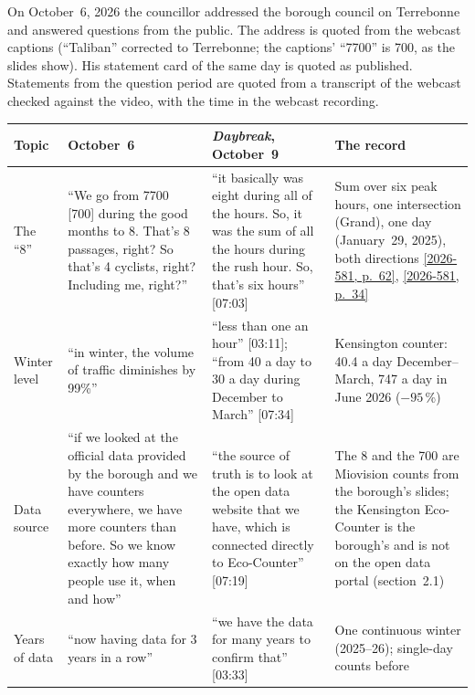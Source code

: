 \documentclass[11pt,letterpaper]{article}
\newcommand{\pagesurl}{https://openmobilitydata.github.io/Terrebonne-access-requests}
\newcommand{\cliptime}[1]{\textsf{\small[#1]}}
\newcommand{\pgl}[2]{\href{\pagesurl/2026-581/raw/01_emails_mandate_counts.pdf\#page=#1}{\textsf{\small[2026-581, p.~#2]}}}
\newcommand{\pg}[1]{\pgl{#1}{#1}}
\newif\ifqa\qatrue
\begin{document}
On October~6, 2026 the councillor addressed the borough council on
Terrebonne and answered questions from the public. The address is quoted
from the webcast captions (``Taliban'' corrected to Terrebonne; the
captions' ``7700'' is 700, as the slides show). His statement card of the
same day is quoted as published. \ifqa Statements from the question period
are quoted from a transcript of the webcast checked against the video, with
the time in the webcast recording.\else Statements from the question period are not used here:
the transcript of the webcast has not yet been checked against the
video.\fi

\begin{small}
\begin{longtable}{>{\raggedright\arraybackslash}p{2.2cm}>{\raggedright\arraybackslash}p{4.4cm}>{\raggedright\arraybackslash}p{4.4cm}>{\raggedright\arraybackslash}p{3.6cm}}
\toprule
Topic & October~6 & \emph{Daybreak}, October~9 & The record \\
\midrule
\endhead
The ``8'' & ``We go from 7700 [700] during the good months to 8. That's 8 passages, right? So that's 4 cyclists, right? Including me, right?'' & ``it basically was eight during all of the hours. So, it was the sum of all the hours during the rush hour. So, that's six hours'' \cliptime{07:03} & Sum over six peak hours, one intersection (Grand), one day (January~29, 2025), both directions \pg{62}, \pg{34} \\
\addlinespace
Winter level & ``in winter, the volume of traffic diminishes by 99\%'' & ``less than one an hour'' \cliptime{03:11}; ``from 40 a day to 30 a day during December to March'' \cliptime{07:34} & Kensington counter: 40.4 a day December--March, 747 a day in June 2026 ($-95$\,\%) \\
\addlinespace
Data source & ``if we looked at the official data provided by the borough and we have counters everywhere, we have more counters than before. So we know exactly how many people use it, when and how'' & ``the source of truth is to look at the open data website that we have, which is connected directly to Eco-Counter'' \cliptime{07:19} & The 8 and the 700 are Miovision counts from the borough's slides; the Kensington Eco-Counter is the borough's and is not on the open data portal (section~2.1) \\
\addlinespace
Years of data & ``now having data for 3 years in a row'' & ``we have the data for many years to confirm that'' \cliptime{03:33} & One continuous winter (2025--26); single-day counts before \\

\end{longtable}
\end{small}
\end{document}
